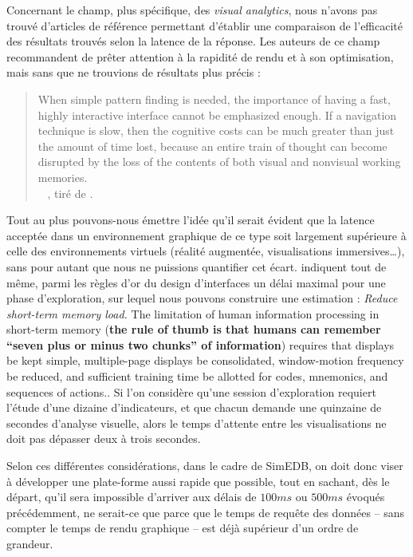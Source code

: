 Concernant le champ, plus spécifique, des \textit{visual analytics}, nous n'avons pas trouvé d'articles de référence permettant d'établir une comparaison de l'efficacité des résultats trouvés selon la latence de la réponse.
Les auteurs de ce champ recommandent de prêter attention à la rapidité de rendu et à son optimisation, mais sans que ne trouvions de résultats plus précis :
\begin{quotation}
\og
When simple pattern finding is needed, the importance of having a fast, highly interactive interface cannot be emphasized	enough. If a navigation technique is slow, then the cognitive costs can be much greater than just the amount of time lost, because an entire train of thought can become disrupted by the loss of the contents of both visual and nonvisual working memories.
\fg{}\\
\mbox{}~ \hfill  \cite{ware_information_2012}, tiré de \cite[12]{amirpour_amraii_human-data_2018}.
\end{quotation}

Tout au plus pouvons-nous émettre l'idée qu'il serait évident que la latence acceptée dans un environnement graphique de ce type soit largement supérieure à celle des environnements virtuels (réalité augmentée, visualisations immersives\ldots), sans pour autant que nous ne puissions quantifier cet écart.
\cite[74]{shneiderman_designing_2004} indiquent tout de même, parmi les  règles d'or du design d'interfaces\fg{} un délai maximal pour une phase d'exploration, sur lequel nous pouvons construire une estimation : \og \textit{Reduce short-term memory load.} The limitation of human information processing in short-term memory (\textbf{the rule of thumb is that humans can remember ``seven plus or minus two chunks'' of information}) requires that displays be kept simple, multiple-page displays be consolidated, window-motion frequency be reduced, and sufficient training time be allotted for codes, mnemonics, and sequences of actions.\fg{}.
Si l'on considère qu'une session d'exploration requiert l'étude d'une dizaine d'indicateurs, et que chacun demande une quinzaine de secondes d'analyse visuelle, alors le temps d'attente entre les visualisations ne doit pas dépasser deux à trois secondes.

Selon ces différentes considérations, dans le cadre de SimEDB, on doit donc viser à développer une plate-forme aussi rapide que possible, tout en sachant, dès le départ, qu'il sera impossible d'arriver aux délais de $100ms$ ou $500ms$ évoqués précédemment, ne serait-ce que parce que le temps de requête des données -- sans compter le temps de rendu graphique -- est déjà supérieur d'un ordre de grandeur.

